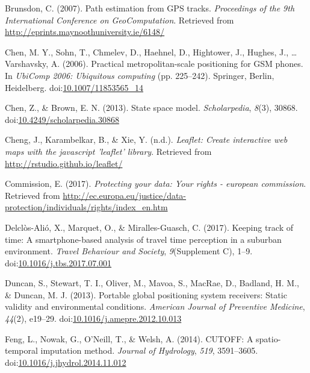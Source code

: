 \documentclass[man]{apa6}
\theoremstyle{definition}
\theoremstyle{definition}
\theoremstyle{definition}
\theoremstyle{remark}
\begin{document}
\hypertarget{ref-brunsdon_path_2007}{}
Brunsdon, C. (2007). Path estimation from GPS tracks. \emph{Proceedings
of the 9th International Conference on GeoComputation}. Retrieved from
\url{http://eprints.maynoothuniversity.ie/6148/}

\hypertarget{ref-chen_practical_2006}{}
Chen, M. Y., Sohn, T., Chmelev, D., Haehnel, D., Hightower, J., Hughes,
J., \ldots{} Varshavsky, A. (2006). Practical metropolitan-scale
positioning for GSM phones. In \emph{UbiComp 2006: Ubiquitous computing}
(pp. 225--242). Springer, Berlin, Heidelberg.
doi:\href{https://doi.org/10.1007/11853565_14}{10.1007/11853565\_14}

\hypertarget{ref-chen_state_2013}{}
Chen, Z., \& Brown, E. N. (2013). State space model.
\emph{Scholarpedia}, \emph{8}(3), 30868.
doi:\href{https://doi.org/10.4249/scholarpedia.30868}{10.4249/scholarpedia.30868}

\hypertarget{ref-R-leaflet}{}
Cheng, J., Karambelkar, B., \& Xie, Y. (n.d.). \emph{Leaflet: Create
interactive web maps with the javascript 'leaflet' library}. Retrieved
from \url{http://rstudio.github.io/leaflet/}

\hypertarget{ref-commission_protecting_2017}{}
Commission, E. (2017). \emph{Protecting your data: Your rights -
european commission}. Retrieved from
\url{http://ec.europa.eu/justice/data-protection/individuals/rights/index_en.htm}

\hypertarget{ref-delclos-alio_keeping_2017}{}
Delclòs-Alió, X., Marquet, O., \& Miralles-Guasch, C. (2017). Keeping
track of time: A smartphone-based analysis of travel time perception in
a suburban environment. \emph{Travel Behaviour and Society},
\emph{9}(Supplement C), 1--9.
doi:\href{https://doi.org/10.1016/j.tbs.2017.07.001}{10.1016/j.tbs.2017.07.001}

\hypertarget{ref-duncan_portable_2013}{}
Duncan, S., Stewart, T. I., Oliver, M., Mavoa, S., MacRae, D., Badland,
H. M., \& Duncan, M. J. (2013). Portable global positioning system
receivers: Static validity and environmental conditions. \emph{American
Journal of Preventive Medicine}, \emph{44}(2), e19--29.
doi:\href{https://doi.org/10.1016/j.amepre.2012.10.013}{10.1016/j.amepre.2012.10.013}

\hypertarget{ref-feng_cutoff:_2014}{}
Feng, L., Nowak, G., O'Neill, T., \& Welsh, A. (2014). CUTOFF: A
spatio-temporal imputation method. \emph{Journal of Hydrology},
\emph{519}, 3591--3605.
doi:\href{https://doi.org/10.1016/j.jhydrol.2014.11.012}{10.1016/j.jhydrol.2014.11.012}
\end{document}
